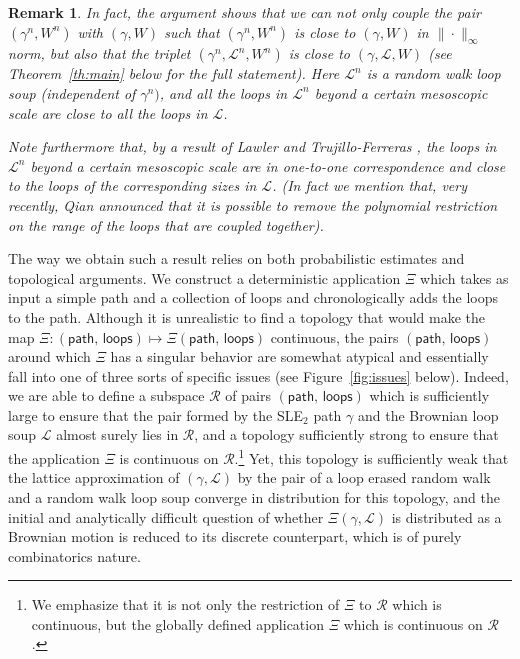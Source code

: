 \documentclass[11pt]{article}
\newtheorem{remark}[theorem]{Remark}
\def\cL{{\mathcal L}}
\def\Conf{{\mathscr{R}}}
\def\Att{{\Xi}}
\begin{document}
\begin{remark} \label{R:coupling3}
In fact, the argument shows that we can not only couple the pair $(\gamma^n, W^n)$ with $(\gamma, W)$ such that $(\gamma^n,W^n)$ is close to $(\gamma,W)$ in $\| \cdot \|_\infty$ norm, but also that the triplet $(\gamma^n, \cL^n, W^n) $ is close to $(\gamma, \cL, W)$ (see Theorem~\ref{th:main} below for the full statement).
 Here $\cL^n$ is a random walk loop soup (independent of $\gamma^n)$, and all the loops in $\cL^n$ beyond a certain mesoscopic scale are close to all the loops in $\cL$. %

Note furthermore that, by a result of Lawler and Trujillo-Ferreras \cite{LawlerFerreras}, the loops in $\cL^n$ beyond a certain mesoscopic scale are in one-to-one correspondence and close to the loops of the corresponding sizes in $\cL$. (In fact we mention that, very recently, Qian \cite{Qian} announced that it is possible to remove the polynomial restriction on the range of the loops that are coupled together).   \end{remark}






The way we obtain such a result relies on both probabilistic estimates and topological arguments. We construct a deterministic application $\Att$ which takes as input a simple path and a collection of loops and chronologically adds the loops to the path. Although it is unrealistic to find a topology that would make the map $\Att: ({\textsf{path, loops}})\mapsto \Att({\textsf{path, loops}})$ continuous, the pairs $({\textsf{path, loops}})$ around which $\Att$ has a singular behavior are somewhat atypical and essentially fall into one of three sorts of specific issues (see Figure~\ref{fig:issues} below). Indeed, we are able to define a subspace $\Conf$ of pairs $({\textsf{path, loops}})$ which is sufficiently large to ensure that the pair formed by the SLE$_2$ path $\gamma$ and the Brownian loop soup $\mathcal{L}$ almost surely lies in $\Conf$, and a topology sufficiently strong to ensure that the application
$\Att$ is continuous on $\Conf$.\footnote{We emphasize that it is not only the restriction of $\Att$ to $\Conf$ which is continuous, but the globally defined application $\Att$ which is continuous on $\Conf$.} Yet, this topology is sufficiently weak that the lattice approximation of
$(\gamma,\mathcal{L})$ by the pair of a loop erased random walk and a random walk loop soup converge in distribution for this topology, and the initial and analytically difficult question of whether $\Att(\gamma,\mathcal{L})$ is distributed as a Brownian motion is reduced to its discrete counterpart, which is of purely combinatorics nature.
\end{document}
